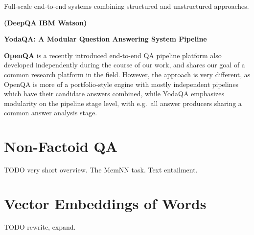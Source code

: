 Full-scale end-to-end systems combining structured and unstructured approaches.

\textbf{(DeepQA IBM Watson)} \citep{WatsonOverview}

\textbf{YodaQA: A Modular Question Answering System Pipeline} \citep{YodaQAPoster2015}

\textbf{OpenQA} \citep{OpenQA} is a recently introduced end-to-end QA pipeline platform
also developed independently during the course of our work, and shares our
goal of a common research platform in the field.  However, the approach
is very different, as OpenQA is more of a portfolio-style engine with
mostly independent pipelines which have their candidate answers combined,
while YodaQA emphasizes modularity on the pipeline stage level,
with e.g.\ all answer producers sharing a common answer analysis stage.





\section{Non-Factoid QA}
\label{sec:nonfactoid}

TODO very short overview.  The MemNN task.  Text entailment.





\section{Vector Embeddings of Words}
\label{sec:embeddings}

TODO rewrite, expand.


